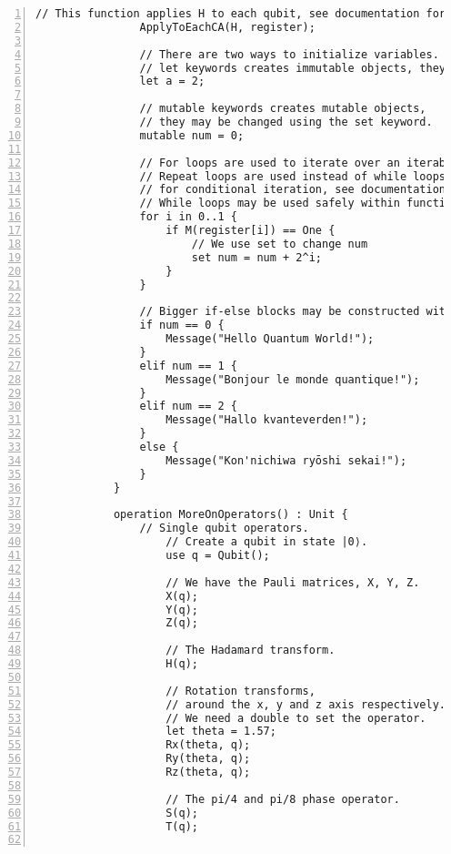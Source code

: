 \documentclass[
10pt, %
a4  paper, %
twoside, %
headinclude,footinclude, %
BCOR=5mm, %
]{scrartcl}
\begin{document}
\begin{Verbatim}[gobble=2, numbers=left, frame=lines,
        framesep=3mm,
        label={[Beginning of code]End of code}]
                // This function applies H to each qubit, see documentation for more info.
                ApplyToEachCA(H, register);

                // There are two ways to initialize variables.
                // let keywords creates immutable objects, they may not be changed.
                let a = 2;

                // mutable keywords creates mutable objects, 
                // they may be changed using the set keyword.
                mutable num = 0;
                
                // For loops are used to iterate over an iterable object
                // Repeat loops are used instead of while loops
                // for conditional iteration, see documentation for more info.
                // While loops may be used safely within function statements.
                for i in 0..1 {
                    if M(register[i]) == One {
                        // We use set to change num
                        set num = num + 2^i;
                    }
                }

                // Bigger if-else blocks may be constructed with elif.
                if num == 0 {
                    Message("Hello Quantum World!");
                }
                elif num == 1 {
                    Message("Bonjour le monde quantique!");
                }
                elif num == 2 {
                    Message("Hallo kvanteverden!");
                }
                else {
                    Message("Kon'nichiwa ryōshi sekai!");
                }
            }

            operation MoreOnOperators() : Unit {
                // Single qubit operators.
                    // Create a qubit in state |0⟩.
                    use q = Qubit();

                    // We have the Pauli matrices, X, Y, Z.
                    X(q);
                    Y(q);
                    Z(q);

                    // The Hadamard transform.
                    H(q);

                    // Rotation transforms,
                    // around the x, y and z axis respectively.
                    // We need a double to set the operator.
                    let theta = 1.57;
                    Rx(theta, q);
                    Ry(theta, q);
                    Rz(theta, q);

                    // The pi/4 and pi/8 phase operator.
                    S(q);
                    T(q);


\end{Verbatim}
\end{document}
